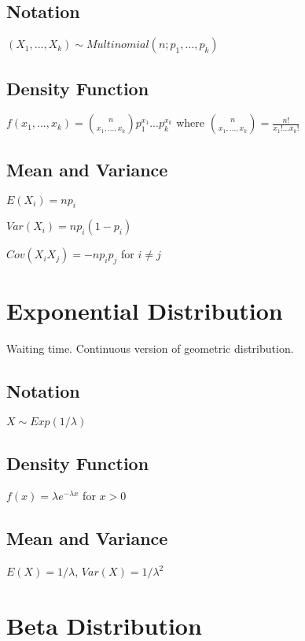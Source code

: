 \documentclass{article}
\begin{document}
\begin{multicols*}{3}
\subsection*{Notation}

$(X_{1},...,X_{k}) \sim Multinomial(n;p_{1},...,p_{k})$

\subsection*{Density Function}

$f(x_{1},...,x_{k}) = {n \choose x_{1},...,x_{k}} p_{1}^{x_{1}}...p_{k}^{x_{k}}$
where ${n \choose x_{1},...,x_{k}} = \frac{n!}{x_{1}! ... x_{k}!}$

\subsection*{Mean and Variance}

$E(X_{i}) = np_{i}$

$Var(X_{i}) = np_{i}(1-p_{i})$

$Cov(X_{i}X_{j}) = - n p_{i} p_{j} $ for $i \neq j$

\section{Exponential Distribution}
\label{sec:expon-dist}

Waiting time. Continuous version of geometric distribution.

\subsection*{Notation}

$X \sim Exp(1/\lambda)$

\subsection*{Density Function}

$f(x) = \lambda e^{-\lambda x}$ for $x > 0$

\subsection*{Mean and Variance}

\(E(X) = 1/\lambda\), \(Var(X) = 1/\lambda^{2}\)


\section{Beta Distribution}
\label{sec:beta-dist}


\end{multicols*}
\end{document}
